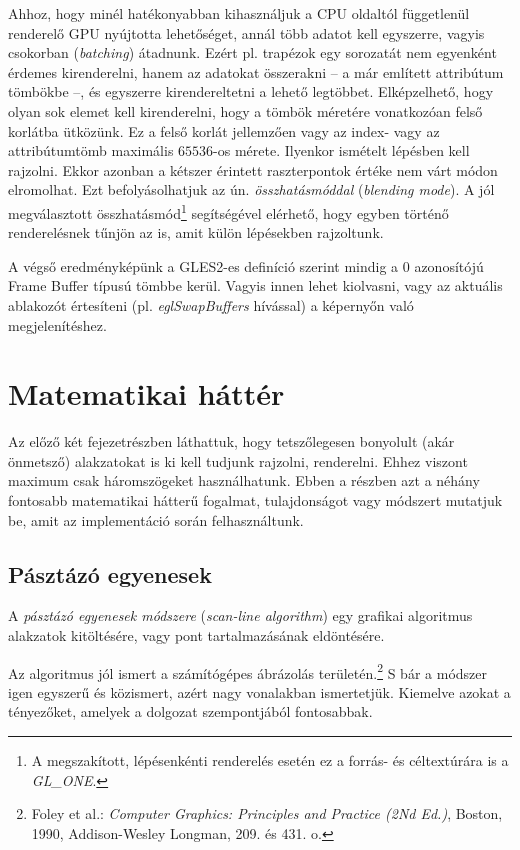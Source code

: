 \documentclass[12pt]{report}
\theoremstyle{definition}
\newcommand{\inenglish}[1]{\textsl{#1}}
\newcommand{\func}[1]{{\textsl{#1}}}
\begin{document}
Ahhoz, hogy minél hatékonyabban kihasználjuk a CPU oldaltól függetlenül
renderelő GPU nyújtotta lehetőséget, annál több adatot kell egyszerre, vagyis
csokorban (\inenglish{batching}) átadnunk. Ezért pl. trapézok egy sorozatát nem
egyenként érdemes kirenderelni, hanem az adatokat összerakni -- a már említett
attribútum tömbökbe --, és egyszerre kirendereltetni a lehető legtöbbet.
Elképzelhető, hogy olyan sok elemet kell kirenderelni, hogy a tömbök méretére
vonatkozóan felső korlátba ütközünk. Ez a felső korlát jellemzően vagy az
index- vagy az attribútumtömb maximális $65536$-os mérete. Ilyenkor ismételt
lépésben kell rajzolni. Ekkor azonban a kétszer érintett raszterpontok értéke
nem várt módon elromolhat. Ezt befolyásolhatjuk az ún. \emph{összhatásmóddal}
(\inenglish{blending mode}). A jól megválasztott összhatásmód\footnote{A
megszakított, lépésenkénti renderelés esetén ez a forrás- és céltextúrára is a
\func{GL\_ONE}.} segítségével elérhető, hogy egyben történő renderelésnek
tűnjön az is, amit külön lépésekben rajzoltunk.

A végső eredményképünk a GLES2-es definíció szerint mindig a $0$ azonosítójú
Frame Buffer típusú tömbbe kerül. Vagyis innen lehet kiolvasni, vagy az
aktuális ablakozót értesíteni (pl. \emph{eglSwapBuffers} hívással) a képernyőn
való megjelenítéshez.

    \section[Matematikai háttér]{Matematikai háttér}
    \label{sec:Matematikai_háttér}

Az előző két fejezetrészben láthattuk, hogy tetszőlegesen bonyolult (akár
önmetsző) alakzatokat is ki kell tudjunk rajzolni, renderelni. Ehhez viszont
maximum csak háromszögeket használhatunk. Ebben a részben azt a néhány fontosabb
matematikai hátterű fogalmat, tulajdonságot vagy módszert mutatjuk be, amit az
implementáció során felhasználtunk.

    \subsection*{Pásztázó egyenesek}
    \label{sec:Pásztázó_egyenesek}

A \emph{pásztázó egyenesek módszere} (\inenglish{scan-line algorithm}) egy
grafikai algoritmus alakzatok kitöltésére, vagy pont tartalmazásának
eldöntésére.

Az algoritmus jól ismert a számítógépes ábrázolás területén.\footnote{Foley et
al.: \emph{Computer Graphics: Principles and Practice (2Nd Ed.)}, Boston, 1990,
Addison-Wesley Longman, 209. és 431. o.} S bár a módszer igen egyszerű és
közismert, azért nagy vonalakban ismertetjük. Kiemelve azokat a tényezőket,
amelyek a dolgozat szempontjából fontosabbak.
\end{document}
